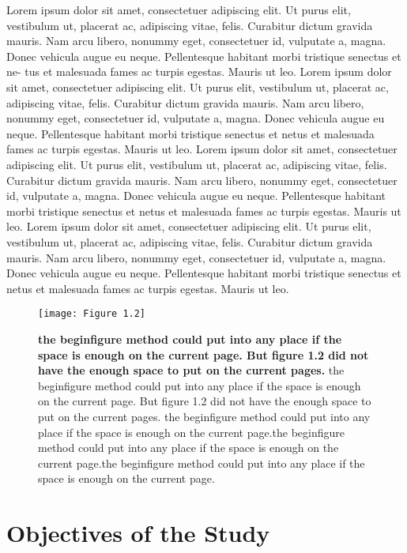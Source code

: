 Lorem ipsum dolor sit amet, consectetuer adipiscing elit. Ut purus elit, vestibulum ut, placerat ac, adipiscing vitae, felis. Curabitur dictum gravida mauris. Nam arcu libero, nonummy eget, consectetuer id, vulputate a, magna. Donec vehicula augue eu neque. Pellentesque habitant morbi tristique senectus et ne-
tus et malesuada fames ac turpis egestas. Mauris ut leo. Lorem ipsum dolor sit amet, consectetuer adipiscing elit. Ut purus elit, vestibulum ut, placerat ac, adipiscing vitae, felis. Curabitur dictum gravida mauris. Nam arcu libero, nonummy eget, consectetuer id, vulputate a, magna. Donec vehicula augue eu neque. Pellentesque habitant morbi tristique senectus et netus et malesuada fames ac turpis egestas. Mauris ut leo. Lorem ipsum dolor sit amet, consectetuer adipiscing elit. Ut purus elit, vestibulum ut, placerat ac, adipiscing vitae, felis. Curabitur dictum gravida mauris. Nam arcu libero, nonummy eget, consectetuer id, vulputate a, magna. Donec vehicula augue eu neque. Pellentesque habitant morbi tristique senectus et netus et malesuada fames ac turpis egestas. Mauris ut leo. Lorem ipsum dolor sit amet, consectetuer adipiscing elit. Ut purus elit, vestibulum ut, placerat ac, adipiscing vitae, felis. Curabitur dictum gravida mauris. Nam arcu libero, nonummy eget, consectetuer id, vulputate a, magna. Donec vehicula augue eu neque. Pellentesque habitant morbi tristique senectus et netus et malesuada fames ac turpis egestas. Mauris ut leo.

\begin{figure}[htbp!]
  \centering
  \texttt{[image: Figure 1.2]}
  \caption[the begin{figure} method could put into any place if the space is enough on the current page.]{\textbf{the begin{figure} method could put into any place if the space is enough on the current page. But figure 1.2 did not have the enough space to put on the current pages.} the begin{figure} method could put into any place if the space is enough on the current page. But figure 1.2 did not have the enough space to put on the current pages. the begin{figure} method could put into any place if the space is enough on the current page.the begin{figure} method could put into any place if the space is enough on the current page.the begin{figure} method could put into any place if the space is enough on the current page.}
  \end{figure}


\section{Objectives of the Study}

